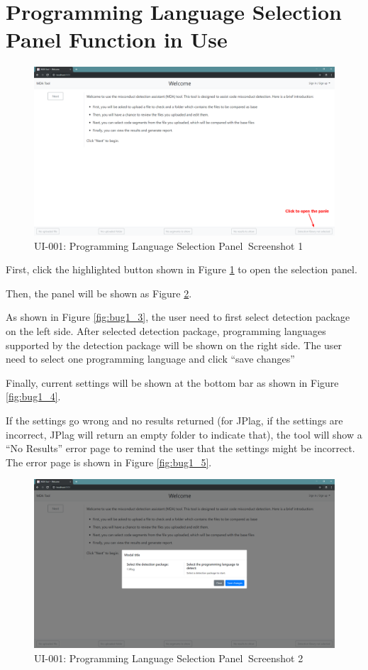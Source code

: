 \documentclass[twoside,a4paper]{refart}
\newcommand{\bugfirst}{UI-001: Programming Language Selection Panel}
\begin{document}
\section{Programming Language Selection Panel Function in Use}
\label{bug_1_expl}
\begin{figure}[!h]
\centering
\includegraphics[width=12cm]{img/bug_1-1.png}
\caption{\bugfirst $\ $ Screenshot 1}
\label{fig:bug1_1}
\end{figure}

First, click the highlighted button shown in Figure \ref{fig:bug1_1} to open the selection panel.

Then, the panel will be shown as Figure \ref{fig:bug1_2}.

As shown in Figure \ref{fig:bug1_3}, the user need to first select detection package on the left side. After selected detection package, programming languages supported by the detection package will be shown on the right side. The user need to select one programming language and click \enquote{save changes}

Finally, current settings will be shown at the bottom bar as shown in Figure \ref{fig:bug1_4}.

If the settings go wrong and no results returned (for JPlag, if the settings are incorrect, JPlag will return an empty folder to indicate that), the tool will show a \enquote{No Results} error page to remind the user that the settings might be incorrect. The error page is shown in Figure \ref{fig:bug1_5}.

\begin{figure}[!h]
\centering
\includegraphics[width=12cm]{img/bug_1-2.png}
\caption{\bugfirst $\ $ Screenshot 2}
\label{fig:bug1_2}
\end{figure}
\end{document}
